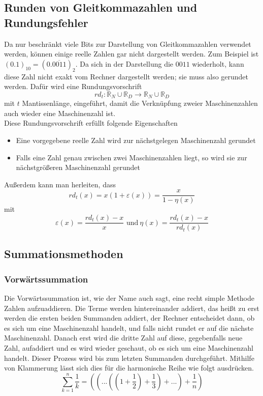 \documentclass{scrartcl}
\begin{document}
\subsection{Runden von Gleitkommazahlen und Rundungsfehler}
Da nur beschränkt viele Bits zur Darstellung von Gleitkommazahlen verwendet werden, können einige reelle Zahlen gar nicht dargestellt werden.
Zum Beispiel ist \\ 
\((0.1)_{10} = (0. \overline{0011})_2 \). Da sich in der Darstellung die \(0011\) wiederholt, kann diese Zahl nicht exakt vom Rechner dargestellt werden;
sie muss also gerundet werden.
Dafür wird eine Rundungsvorschrift
\[rd_t: \mathbb{R}_N \cup \mathbb{R}_D \rightarrow \mathbb{R}_N \cup \mathbb{R}_D\]
mit \(t\) Mantissenlänge, eingeführt, damit die Verknüpfung zweier Maschinenzahlen auch wieder eine Maschinenzahl ist.  \\
Diese Rundungsvorschrift erfüllt folgende Eigenschaften
\begin{itemize}
  \item Eine vorgegebene reelle Zahl wird zur nächstgelegen Maschinenzahl gerundet
  \item Falls eine Zahl genau zwischen zwei Maschinenzahlen liegt, so wird sie zur nächstgrößeren Maschinenzahl gerundet
\end{itemize}
Außerdem kann man herleiten, dass
\[rd_t(x) = x(1+\varepsilon(x)) = \frac{x}{1-\eta(x)}\]
mit
\[\varepsilon(x) = \frac{rd_t(x) - x}{x} \text{  und}\   \eta(x) = \frac{rd_t(x) - x}{rd_t(x)} \]

\subsection{Summationsmethoden}
\subsubsection{Vorwärtssummation}
Die Vorwärtssummation ist, wie der Name auch sagt, eine recht simple Methode Zahlen aufzuaddieren.
Die Terme werden hintereinander addiert, das heißt zu erst werden die ersten beiden Summanden addiert, 
der Rechner entscheidet dann, ob es sich um eine Maschinenzahl handelt, und falls nicht rundet er auf die 
nächste Maschinenzahl. Danach erst wird die dritte Zahl auf diese, gegebenfalls neue Zahl, aufaddiert und es wird 
wieder geschaut, ob es sich um eine Maschinenzahl handelt. Dieser Prozess wird bis zum letzten Summanden durchgeführt.
Mithilfe von Klammerung lässt sich dies für die harmonische Reihe wie folgt ausdrücken.
\[ \sum_{k=1}^{n} \frac{1}{k} = ((...((1+\frac{1}{2})+\frac{1}{3})+ ...) + \frac{1}{n}) \]
\end{document}
